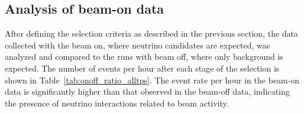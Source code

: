 
\subsection{Analysis of beam-on data}


\begin{table}[htbp]
\centering
{}
\caption{Beam-on and beam-off events per hour with the corresponding ratio for various selection cuts, considering all the available time with the spill on.}
\label{tab:onoff_ratio_alltps}
\end{table}

After defining the selection criteria as described in the previous section, the data collected with the beam on, where neutrino candidates are expected, 
was analyzed and compared to the runs with beam off, where only background is expected. The number of events per hour after each stage of the selection is shown 
in Table~\ref{tab:onoff_ratio_alltps}.
The event rate per hour in the beam-on data is significantly higher than that observed in the beam-off data, indicating the presence of neutrino interactions related to beam activity. 

